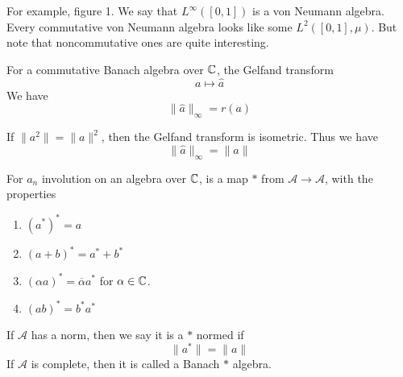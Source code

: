 For example, figure 1. We say that $L^\infty([0,1])$ is a von Neumann algebra. Every commutative von Neumann algebra looks like some $L^2([0,1], \mu)$. But note that noncommutative ones are quite interesting.

For a commutative Banach algebra over $\mathbb{C}$, the Gelfand transform
\begin{equation*}
    a\mapsto\widehat{a}
\end{equation*}
We have
\begin{equation*}
    \|\widehat{a}\|_\infty=r(a)
\end{equation*}
\begin{proposition}
    If $\|a^2\|=\|a\|^2$, then the Gelfand transform is isometric. Thus we have
\begin{equation*}
    \|\widehat{a}\|_\infty=\|a\|
\end{equation*}
\end{proposition}

\begin{definition}
    For $a_n$ involution on an algebra over $\mathbb{C}$, is a map $*$ from $\mathcal{A}\to\mathcal{A}$, with the properties
\begin{enumerate}
    \item $(a^*)^*=a$
    \item $(a+b)^*=a^*+b^*$
    \item $(\alpha a)^*=\overline{\alpha}a^*$ for $\alpha\in\mathbb{C}$.
    \item $(ab)^*=b^*a^*$
\end{enumerate}
\end{definition}

\begin{definition}
    If $\mathcal{A}$ has a norm, then we say it is a $*$ normed if
\begin{equation*}
    \|a^*\|=\|a\|
\end{equation*}
If $\mathcal{A}$ is complete, then it is called a Banach $*$ algebra.
\end{definition}

